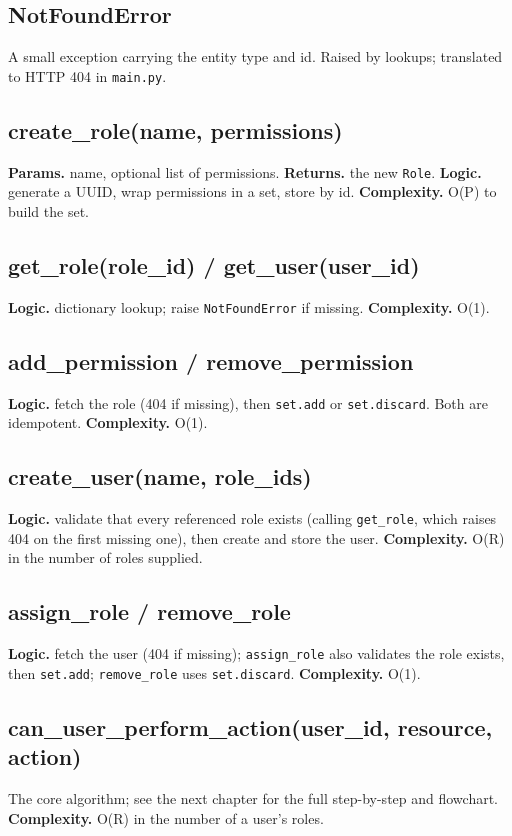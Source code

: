 \documentclass[11pt,a4paper]{report}
\begin{document}
\subsection*{NotFoundError}
A small exception carrying the entity type and id. Raised by lookups; translated
to HTTP 404 in \texttt{main.py}.

\subsection*{create\_role(name, permissions)}
\textbf{Params.} name, optional list of permissions. \textbf{Returns.} the new
\texttt{Role}. \textbf{Logic.} generate a UUID, wrap permissions in a set, store
by id. \textbf{Complexity.} O(P) to build the set.

\subsection*{get\_role(role\_id) / get\_user(user\_id)}
\textbf{Logic.} dictionary lookup; raise \texttt{NotFoundError} if missing.
\textbf{Complexity.} O(1).

\subsection*{add\_permission / remove\_permission}
\textbf{Logic.} fetch the role (404 if missing), then \texttt{set.add} or
\texttt{set.discard}. Both are idempotent. \textbf{Complexity.} O(1).

\subsection*{create\_user(name, role\_ids)}
\textbf{Logic.} validate that every referenced role exists (calling
\texttt{get\_role}, which raises 404 on the first missing one), then create and
store the user. \textbf{Complexity.} O(R) in the number of roles supplied.

\subsection*{assign\_role / remove\_role}
\textbf{Logic.} fetch the user (404 if missing); \texttt{assign\_role} also
validates the role exists, then \texttt{set.add}; \texttt{remove\_role} uses
\texttt{set.discard}. \textbf{Complexity.} O(1).

\subsection*{can\_user\_perform\_action(user\_id, resource, action)}
The core algorithm; see the next chapter for the full step-by-step and
flowchart. \textbf{Complexity.} O(R) in the number of a user's roles.
\end{document}
